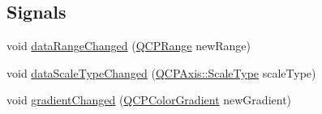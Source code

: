 \subsection*{Signals}
\begin{DoxyCompactItemize}
\item 
void \hyperlink{classQCPColorScale_a293176da9447ec6819be1d901966a257}{data\+Range\+Changed} (\hyperlink{classQCPRange}{Q\+C\+P\+Range} new\+Range)
\item 
void \hyperlink{classQCPColorScale_a61558b962f7791ff2f15a565dcf60181}{data\+Scale\+Type\+Changed} (\hyperlink{classQCPAxis_a36d8e8658dbaa179bf2aeb973db2d6f0}{Q\+C\+P\+Axis\+::\+Scale\+Type} scale\+Type)
\item 
void \hyperlink{classQCPColorScale_a67a5eb06cf551d322885e8635a46378c}{gradient\+Changed} (\hyperlink{classQCPColorGradient}{Q\+C\+P\+Color\+Gradient} new\+Gradient)
\end{DoxyCompactItemize}
